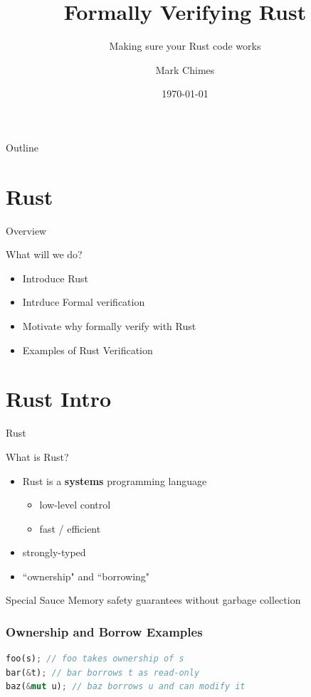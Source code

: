 \documentclass{beamer}
\title{Formally Verifying Rust}
\subtitle{Making sure your Rust code works}
\author{Mark Chimes}
\date{\today}
\begin{document}
\begin{frame}
    \titlepage
\end{frame}

\begin{frame}{Outline}
\tableofcontents
\end{frame}

\section{Rust}
\begin{frame}{Overview}
\begin{block}{What will we do?}
\begin{itemize} 
	\item Introduce Rust
	\item Intrduce Formal verification
	\item Motivate why formally verify with Rust
	\item Examples of Rust Verification
\end{itemize}
\end{block}
\end{frame}


\section{Rust Intro}
\begin{frame}{Rust}
\begin{block}{What is Rust?}
\begin{itemize}
	\item Rust is a \textbf{systems} programming language
	\begin{itemize}
		\item low-level control
		\item fast / efficient
	\end{itemize}
	\item strongly-typed
	\item ``ownership" and ``borrowing"
\end{itemize}
\end{block}
\begin{block}{Special Sauce} 
Memory safety guarantees without garbage collection
\end{block}
\end{frame}


\begin{frame}[fragile]
\frametitle{Ownership and Borrow Examples}
\begin{lstlisting}[language=Rust]
foo(s); // foo takes ownership of s
bar(&t); // bar borrows t as read-only
baz(&mut u); // baz borrows u and can modify it
\end{lstlisting}
\end{frame}
\end{document}
